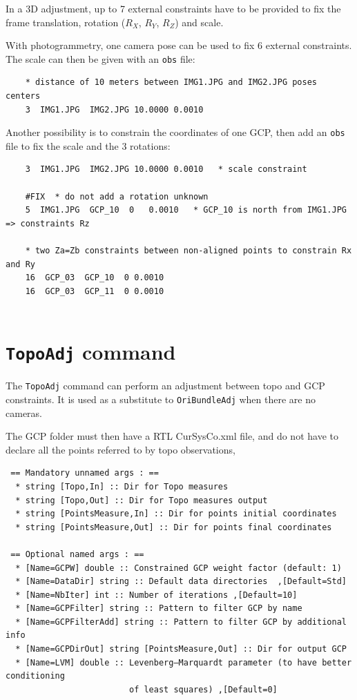 In a 3D adjustment, up to 7 external constraints have to be provided to fix the frame translation, rotation ($R_X$, $R_Y$, $R_Z$) and scale.

With photogrammetry, one camera pose can be used to fix 6 external constraints. The scale can then be given with an {\tt obs} file:
\begin{verbatim}
    * distance of 10 meters between IMG1.JPG and IMG2.JPG poses centers
    3  IMG1.JPG  IMG2.JPG 10.0000 0.0010   
\end{verbatim}

Another possibility is to constrain the coordinates of one GCP, then add an {\tt obs} file to fix the scale and the 3 rotations:
\begin{verbatim}
    3  IMG1.JPG  IMG2.JPG 10.0000 0.0010   * scale constraint

    #FIX  * do not add a rotation unknown
    5  IMG1.JPG  GCP_10  0   0.0010   * GCP_10 is north from IMG1.JPG => constraints Rz

    * two Za=Zb constraints between non-aligned points to constrain Rx and Ry
    16  GCP_03  GCP_10  0 0.0010
    16  GCP_03  GCP_11  0 0.0010
    
\end{verbatim}


\section{\texttt{TopoAdj} command}
\label{sec:TopoAdj}

The {\tt TopoAdj} command can perform an adjustment between topo and GCP constraints.
It is used as a substitute to {\tt OriBundleAdj} when there are no cameras.

The GCP folder must then have a RTL CurSysCo.xml file, and do not have to declare all the points
referred to by topo observations, 


\begin{verbatim}
 == Mandatory unnamed args : ==
  * string [Topo,In] :: Dir for Topo measures
  * string [Topo,Out] :: Dir for Topo measures output
  * string [PointsMeasure,In] :: Dir for points initial coordinates
  * string [PointsMeasure,Out] :: Dir for points final coordinates

 == Optional named args : ==
  * [Name=GCPW] double :: Constrained GCP weight factor (default: 1)
  * [Name=DataDir] string :: Default data directories  ,[Default=Std]
  * [Name=NbIter] int :: Number of iterations ,[Default=10]
  * [Name=GCPFilter] string :: Pattern to filter GCP by name
  * [Name=GCPFilterAdd] string :: Pattern to filter GCP by additional info
  * [Name=GCPDirOut] string [PointsMeasure,Out] :: Dir for output GCP
  * [Name=LVM] double :: Levenberg–Marquardt parameter (to have better conditioning
                         of least squares) ,[Default=0]

\end{verbatim}



